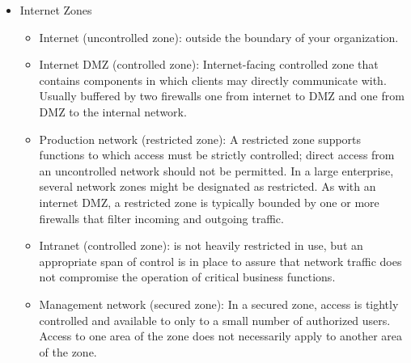\begin{itemize}
    \item Internet Zones
    \begin{itemize}
        \item Internet (uncontrolled zone): outside the boundary of your organization.
        \item Internet DMZ (controlled zone): Internet-facing controlled zone that contains components in which clients may directly communicate with. Usually buffered by two firewalls one from internet to DMZ and one from DMZ to the internal network.
        \item Production network (restricted zone): A restricted zone supports functions to which access must be strictly controlled; direct access from an uncontrolled network should not be permitted. In a large enterprise, several network zones might be designated as restricted. As with an internet DMZ, a restricted zone is typically bounded by one or more firewalls that filter incoming and outgoing traffic.
        \item Intranet (controlled zone): is not heavily restricted in use, but an appropriate span of control is in place to assure that network traffic does not compromise the operation of critical business functions.
        \item Management network (secured zone): In a secured zone, access is tightly controlled and available to only to a small number of authorized users. Access to one area of the zone does not necessarily apply to another area of the zone.
    \end{itemize}
\end{itemize}

